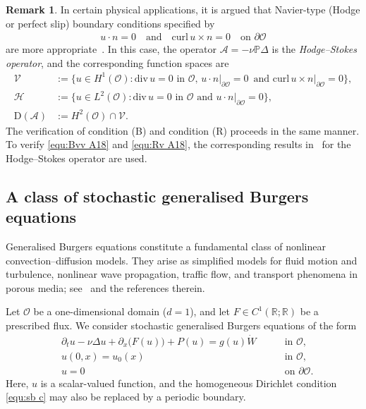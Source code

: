 \documentclass[11pt, reqno]{amsart}
\theoremstyle{definition}
\newtheorem{remark}[theorem]{Remark}
\numberwithin{equation}{section}
\newcommand{\bb}{\mathbb}
\newcommand{\divg}{\mathrm{div}\,}
\begin{document}
\begin{remark}
In certain physical applications, it is argued that Navier-type (Hodge or perfect slip) boundary conditions specified by
\begin{align}\label{equ:navier bc}
    u\cdot n=0 \quad \text{and} \quad \mathrm{curl}\, u\times n=0 \quad \text{on $\partial \mathscr{O}$}
\end{align}
are more appropriate~\cite{AceAmrCon19}. In this case, the operator $\mathcal{A}=-\nu \bb{P}\Delta$ is the \emph{Hodge--Stokes operator}, and the corresponding function spaces are
\begin{align*}
    \mathcal{V} &:= \{u\in H^1(\mathscr{O}): \divg u=0 \text{ in $\mathscr{O}$, } \left. u\cdot n \right|_{\partial \mathscr{O}}= 0 \,\text{ and } \left.\mathrm{curl}\, u\times n\right|_{\partial\mathscr{O}}=0 \},
    \\
    \mathcal{H} &:= \{u\in L^2(\mathscr{O}): \divg u=0 \text{ in $\mathscr{O}$ and } \left. u\cdot n \right|_{\partial \mathscr{O}}= 0\},
    \\
    \mathrm{D}(\mathcal{A}) &:= H^2(\mathscr{O}) \cap \mathcal{V}.
\end{align*}
The verification of condition (B) and condition (R) proceeds in the same manner. To verify \eqref{equ:Bvv A18} and \eqref{equ:Rv A18}, the corresponding results in~\cite{Kun25} for the Hodge--Stokes operator are used.
\end{remark}



\subsection{A class of stochastic generalised Burgers equations}\label{sec:burgers}

Generalised Burgers equations constitute a fundamental class of nonlinear
convection--diffusion models. They arise as simplified models for fluid
motion and turbulence, nonlinear wave propagation, traffic flow, and
transport phenomena in porous media; see~\cite{BecKha07} and the references
therein.

Let $\mathscr O$ be a one-dimensional domain ($d=1$), and let
$F\in C^1(\mathbb R;\mathbb R)$ be a prescribed flux. We consider stochastic
generalised Burgers equations of the form
\begin{subequations}\label{equ:sb}
	\begin{alignat}{2}
		&\partial_t u - \nu \Delta u + \partial_x\big(F(u)\big) + P(u)
		= g(u)\dot W
		\; && \quad\text{in $\mathscr O$,}
		\label{equ:sb a}
		\\[1ex]
		&u(0,x)= u_0(x)
		\; && \quad\text{in $\mathscr O$,}
		\label{equ:sb b}
		\\[1ex]
		&u = 0
		\; && \quad\text{on $\partial\mathscr O$.}
		\label{equ:sb c}
	\end{alignat}
\end{subequations}
Here, $u$ is a scalar-valued function, and the homogeneous Dirichlet condition \eqref{equ:sb c} may also be replaced by a periodic boundary.
\end{document}
